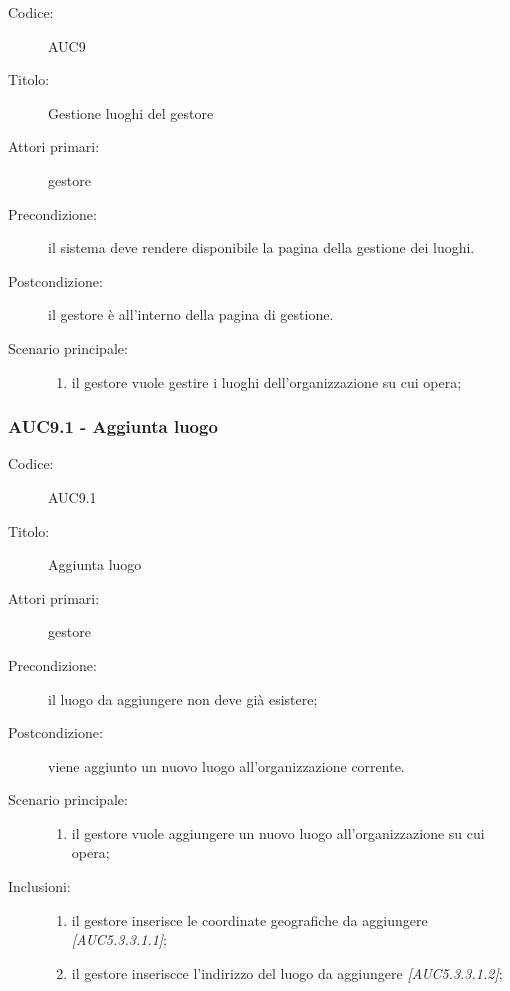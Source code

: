 \documentclass[../analisi-dei-requisiti.tex]{subfiles}
\begin{document}
\begin{description}
  \item[Codice:] AUC9
  \item[Titolo:] Gestione luoghi del gestore
  \item[Attori primari:] gestore
  \item[Precondizione:] il sistema deve rendere disponibile la pagina della gestione dei luoghi.
  \item[Postcondizione:] il gestore è all'interno della pagina di gestione.
  \item[Scenario principale:]
  \begin{enumerate}
    \item il gestore vuole gestire i luoghi dell'organizzazione su cui opera;
  \end{enumerate}
\end{description}

\subsubsection{AUC9.1 - Aggiunta luogo}%
\label{subsub:AUC9.1}
\begin{description}
  \item[Codice:] AUC9.1
  \item[Titolo:] Aggiunta luogo
  \item[Attori primari:] gestore
  \item[Precondizione:] il luogo da aggiungere non deve già esistere;
  \item[Postcondizione:] viene aggiunto un nuovo luogo all'organizzazione corrente.
  \item[Scenario principale:]
  \begin{enumerate}
    \item il gestore vuole aggiungere un nuovo luogo all'organizzazione su cui opera;
  \end{enumerate}
  \item[Inclusioni:]
  \begin{enumerate}
    \item il gestore inserisce le coordinate geografiche da aggiungere \emph{[AUC5.3.3.1.1]};
    \item il gestore inseriscce l'indirizzo del luogo da aggiungere \emph{[AUC5.3.3.1.2]};
  \end{enumerate}
\end{description}
\end{document}
